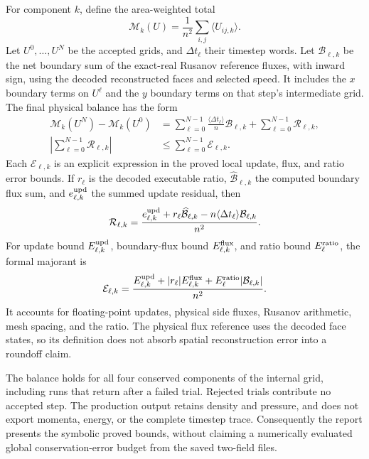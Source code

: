 \documentclass[11pt]{article}
\newcommand{\val}[1]{\langle #1\rangle}
\begin{document}
For component $k$, define the area-weighted total
\begin{equation}
\mathcal M_k(U)=\frac1{n^2}\sum_{i,j}\val{U_{ij,k}}.
\end{equation}
Let $U^0,\ldots,U^N$ be the accepted grids, and $\Delta t_\ell$ their timestep words.  Let $\mathcal B_{\ell,k}$ be the net boundary sum of the exact-real Rusanov reference fluxes, with inward sign, using the decoded reconstructed faces and selected speed.  It includes the $x$ boundary terms on $U^\ell$ and the $y$ boundary terms on that step's intermediate grid.  The final physical balance has the form
\begin{align}
\mathcal M_k(U^N)-\mathcal M_k(U^0)
&=\sum_{\ell=0}^{N-1}\frac{\val{\Delta t_\ell}}n\mathcal B_{\ell,k}
  +\sum_{\ell=0}^{N-1}\mathcal R_{\ell,k},\label{eq:balance}\\
\left|\sum_{\ell=0}^{N-1}\mathcal R_{\ell,k}\right|
&\leq\sum_{\ell=0}^{N-1}\mathcal E_{\ell,k}.\label{eq:balancebound}
\end{align}
Each $\mathcal E_{\ell,k}$ is an explicit expression in the proved local update, flux, and ratio error bounds.  If $r_\ell$ is the decoded executable ratio, $\widehat{\mathcal B}_{\ell,k}$ the computed boundary flux sum, and $e^{\rm upd}_{\ell,k}$ the summed update residual, then
\begin{equation}
\mathcal R_{\ell,k}=\frac{e^{\rm upd}_{\ell,k}
  +r_\ell\widehat{\mathcal B}_{\ell,k}
  -n\val{\Delta t_\ell}\mathcal B_{\ell,k}}{n^2}.
\end{equation}
For update bound $E^{\rm upd}_{\ell,k}$, boundary-flux bound $E^{\rm flux}_{\ell,k}$, and ratio bound $E^{\rm ratio}_\ell$, the formal majorant is
\begin{equation}
\mathcal E_{\ell,k}=\frac{E^{\rm upd}_{\ell,k}
  +|r_\ell|E^{\rm flux}_{\ell,k}
  +E^{\rm ratio}_\ell|\mathcal B_{\ell,k}|}{n^2}.
\end{equation}
It accounts for floating-point updates, physical side fluxes, Rusanov arithmetic, mesh spacing, and the ratio.  The physical flux reference uses the decoded face states, so its definition does not absorb spatial reconstruction error into a roundoff claim.

The balance holds for all four conserved components of the internal grid, including runs that return after a failed trial.  Rejected trials contribute no accepted step.  The production output retains density and pressure, and does not export momenta, energy, or the complete timestep trace.  Consequently the report presents the symbolic proved bounds, without claiming a numerically evaluated global conservation-error budget from the saved two-field files.
\end{document}
